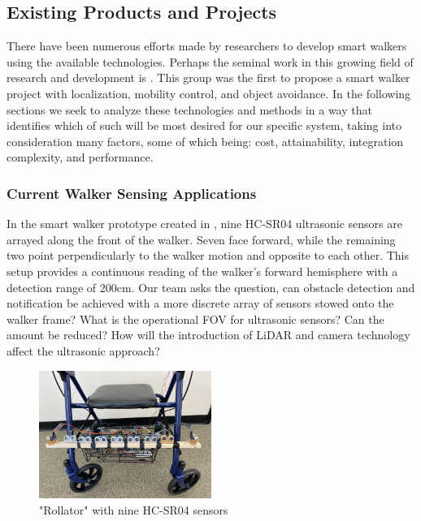\subsection{Existing Products and Projects}

\noindent There have been numerous efforts made by researchers to develop smart walkers using the available technologies. Perhaps the seminal work in this growing field of research and development is \cite{PAMM}. This group was the first to propose a smart walker project with localization, mobility control, and object avoidance. In the following sections we seek to analyze these technologies and methods in a way that identifies which of such will be most desired for our specific system, taking into consideration many factors, some of which being: cost, attainability, integration complexity, and performance.

\subsubsection{Current Walker Sensing Applications}
\noindent In the smart walker prototype created in \cite{Mostofa}, nine HC-SR04 ultrasonic sensors are arrayed along the front of the walker. Seven face forward, while the remaining two point perpendicularly to the walker motion and opposite to each other. This setup provides a continuous reading of the walker's forward hemisphere with a detection range of 200cm. Our team asks the question, can obstacle detection and notification be achieved with a more discrete array of sensors stowed onto the walker frame? What is the operational FOV for ultrasonic sensors? Can the amount be reduced? How will the introduction of LiDAR and camera technology affect the ultrasonic approach?\\

\begin{figure}[h]
	\centering
	\includegraphics[width=0.5\textwidth]{./Images/mostafa9.png}
	\caption{\label{fig:mostafa9}"Rollator" with nine HC-SR04 sensors \cite{Mostofa}}
\end{figure}

